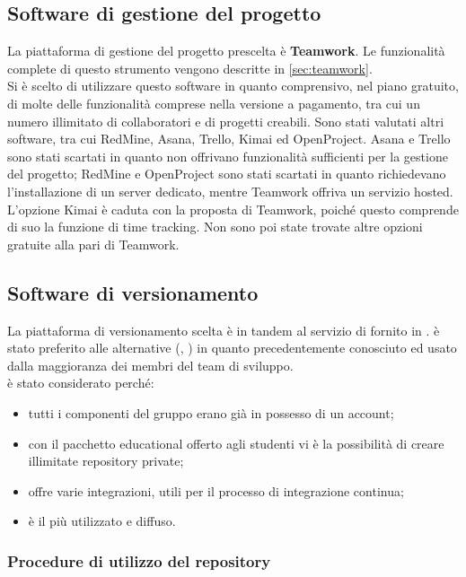 \subsection{Software di gestione del progetto}
La piattaforma di gestione del progetto prescelta è \textbf{Teamwork}. Le funzionalità complete di questo strumento vengono descritte in \sezione\ref{sec:teamwork}.\\
Si è scelto di utilizzare questo software in quanto comprensivo, nel piano gratuito, di molte delle funzionalità comprese nella versione a pagamento, tra cui un numero illimitato di collaboratori e di progetti creabili. Sono stati valutati altri software, tra cui RedMine, Asana, Trello, Kimai ed OpenProject. Asana e Trello sono stati scartati in quanto non offrivano funzionalità sufficienti per la gestione del progetto; RedMine e OpenProject sono stati scartati in quanto richiedevano l'installazione di un server dedicato, mentre Teamwork offriva un servizio hosted. L'opzione Kimai è caduta con la proposta di Teamwork, poiché questo comprende di suo la funzione di time tracking. Non sono poi state trovate altre opzioni gratuite alla pari di Teamwork.

\subsection{Software di versionamento}
La piattaforma di versionamento scelta è  in tandem al servizio di  fornito in .  è stato preferito alle alternative (, ) in quanto precedentemente conosciuto ed usato dalla maggioranza dei membri del team di sviluppo.\\
 è stato considerato perché:
\begin{itemize}
	\item tutti i componenti del gruppo erano già in possesso di un account;
	\item con il pacchetto educational offerto agli studenti vi è la possibilità di creare illimitate repository private;
	\item offre varie integrazioni, utili per il processo di integrazione continua;
	\item è il più utilizzato e diffuso.
\end{itemize}

\subsubsection{Procedure di utilizzo del repository}

